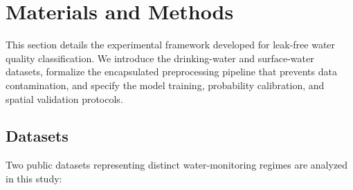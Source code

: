 \documentclass[pdflatex,sn-mathphys-num]{sn-jnl}%
\theoremstyle{thmstyleone}%
\theoremstyle{thmstyletwo}%
\theoremstyle{thmstylethree}%
\begin{document}
\section{Materials and Methods}\label{sec4}
This section details the experimental framework developed for leak-free water quality classification. We introduce the drinking-water and surface-water datasets, formalize the encapsulated preprocessing pipeline that prevents data contamination, and specify the model training, probability calibration, and spatial validation protocols.
\subsection{Datasets}\label{subsec4_1}

Two public datasets representing distinct water-monitoring regimes are analyzed in this study:
\end{document}
